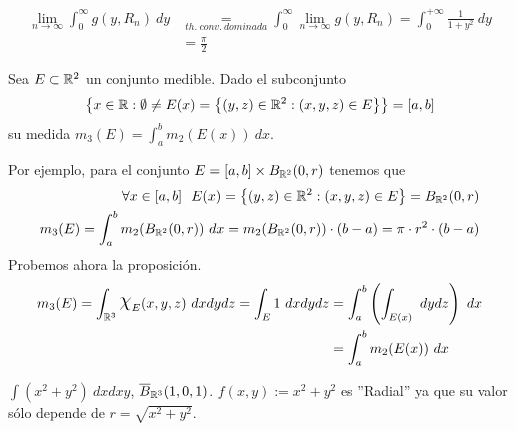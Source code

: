 \begin{sol}
        \begin{align*}
            \label{}
            \lim_{n \to \infty} \int_0^{\infty} g(y, R_n) \ dy &\underset{th. \ conv. \ dominada}{=} \int_0^{\infty} \lim_{n \to \infty} g(y, R_n) = \int_0^{+\infty} \frac{1}{1 + y^2} \ dy \\
                                                               &= \frac{\pi}{2}
        \end{align*}
            \end{sol}

            \begin{ejer}
                Sea $E \subset \mathbb{R}^2$ un conjunto medible. Dado el subconjunto $$\left\{ x \in \mathbb{R} : \emptyset \neq E(x) = \left\{ (y, z) \in \mathbb{R}^2 : (x, y, z) \in E \right\} \right\} = [a, b]$$ su medida $m_3(E) = \int_a^b m_2(E(x)) \ dx $.
            \end{ejer}

            \begin{sol}
                Por ejemplo, para el conjunto  $E = [a, b] \times B_{\mathbb{R}^2} (0, r)$ tenemos que \begin{align*}
                    \label{}
                    \forall x \in [a, b] \ \ E(x) = \left\{ (y, z) \in \mathbb{R}^2 : (x, y, z) \in E \right\} = B_{\mathbb{R}^2}(0, r) \\
                    m_3(E) = \int_a^b m_2 (B_{\mathbb{R}^2}(0, r)) \ dx = m_2(B_{\mathbb{R}^2}(0, r)) \cdot (b - a) = \pi \cdot r^2 \cdot (b -a)
                \end{align*}
                Probemos ahora la proposición.
                \begin{align*}
                    \label{}
                    m_3(E) = \int_{\R^3} \rchi_E (x, y, z) \ dxdydz = \int_E 1 \ dxdydz &= \int_a^b \left( \int_{E(x)} \ dydz \right) \ dx \\
                            &= \int_a^b m_2(E(x)) \ dx
                \end{align*}
            \end{sol}

            \begin{ejer}
                $\int (x^2 + y^2) \ dxdxy$, $\overline{B}_{\mathbb{R}^3} (1, 0, 1)$. $f(x, y) := x^2+y^2$ es ''Radial'' ya que su valor sólo depende de $r = \sqrt{x^2+y^2}$.
            \end{ejer}

